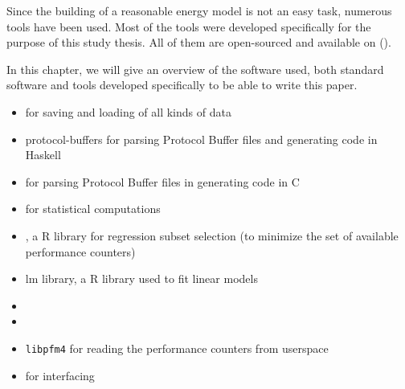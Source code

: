 \label{sec:tools}

Since the building of a reasonable energy model is not an easy task, numerous
tools have been used. Most of the tools were developed specifically for the
purpose of this study thesis. All of them are open-sourced and available on
().

In this chapter, we will give an overview of the software used, both standard
software and tools developed specifically to be able to write this paper.


\label{sec:standard-software}

\begin{itemize}

\item \JWTprotobuf{} for saving and loading of all kinds of data

\item {}
                  {protocol-buffers} for parsing Protocol Buffer files and
generating code in Haskell

\item {}
      for parsing Protocol Buffer files in generating code in C

\item {} for statistical computations

\item {}
      , a R library for regression subset selection (to minimize the set of
      available performance counters)

\item {}
      {lm library}, a R library used to fit linear models

\item {}

\item {}

\item {}
      {\texttt{libpfm4}} for reading the performance counters from userspace

\item \JWTnidaqmxbase{} for interfacing \JWPni

\end{itemize}


